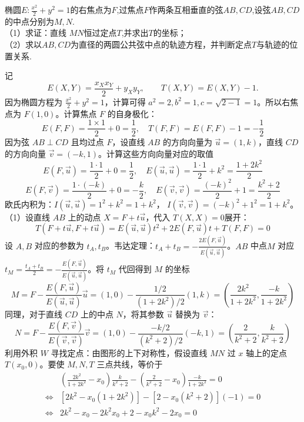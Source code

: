 \begin{exercise}
    椭圆$E:\frac{x^2}2+y^2=1$的右焦点为$F$,过焦点$F$作两条互相垂直的弦$AB,CD$,设弦$AB,CD$ 的中点分别为$M,N.$\\
（1）求证：直线 $MN$恒过定点$T$,并求出$T$的坐标；\\
（2）求以$AB,CD$为直径的两圆公共弦中点的轨迹方程，并判断定点$T$与轨迹的位置关系.
\end{exercise}
\begin{solution}
记
\[
E(X,Y) = \frac{x_X x_Y}{2} + y_X y_Y,\qquad T(X,Y) = E(X,Y) - 1.
\]
因为椭圆方程为 $\frac{x^2}{2} + y^2 = 1$，计算可得 $a^2=2, b^2=1, c = \sqrt{2-1} = 1$。所以右焦点为 $F(1, 0)$。计算焦点 $F$ 的自身极化：
$$E(F,F) = \frac{1 \times 1}{2} + 0 = \frac{1}{2}, \quad T(F,F) = E(F,F) - 1 = -\frac{1}{2}$$
因为弦 $AB \perp CD$ 且均过点 $F$，设直线 $AB$ 的方向向量为 $\vec{u} = (1, k)$，直线 $CD$ 的方向向量 $\vec{v} = (-k, 1)$。计算这些方向向量对应的取值
$$E(F,\vec{u}) = \frac{1 \cdot 1}{2} + 0 = \frac{1}{2}, \quad E(\vec{u},\vec{u}) = \frac{1 \cdot 1}{2} + k^2 = \frac{1+2k^2}{2}$$
$$E(F,\vec{v}) = \frac{1 \cdot (-k)}{2} + 0 = -\frac{k}{2}, \quad E(\vec{v},\vec{v}) = \frac{(-k)^2}{2} + 1 = \frac{k^2+2}{2}$$
欧氏内积为：$I(\vec{u},\vec{u}) = 1^2+k^2 = 1+k^2$， $I(\vec{v},\vec{v}) = (-k)^2+1^2 = 1+k^2$。\\
（1）设直线 $AB$ 上的动点 $X = F + t\vec{u}$，代入 $T(X,X)=0$展开：
$$T(F+t\vec{u}, F+t\vec{u}) = E(\vec{u},\vec{u})t^2 + 2E(F,\vec{u})t + T(F,F) = 0$$
设 $A, B$ 对应的参数为 $t_A, t_B$。韦达定理：$t_A + t_B = -\frac{2E(F,\vec{u})}{E(\vec{u},\vec{u})}$。$AB$ 中点$M$ 对应 $t_M = \frac{t_A+t_B}{2} = -\frac{E(F,\vec{u})}{E(\vec{u},\vec{u})}$。将 $t_M$ 代回得到 $M$ 的坐标
$$M = F - \frac{E(F,\vec{u})}{E(\vec{u},\vec{u})}\vec{u} = (1,0) - \frac{1/2}{(1+2k^2)/2} (1,k) = \left( \frac{2k^2}{1+2k^2}, \frac{-k}{1+2k^2} \right)$$
同理，对于直线 $CD$ 上的中点 $N$，将其参数 $\vec{u}$ 替换为 $\vec{v}$：
$$N = F - \frac{E(F,\vec{v})}{E(\vec{v},\vec{v})}\vec{v} = (1,0) - \frac{-k/2}{(k^2+2)/2} (-k,1) = \left( \frac{2}{k^2+2}, \frac{k}{k^2+2} \right)$$
利用外积 $W$ 寻找定点：由图形的上下对称性，假设直线 $MN$ 过 $x$ 轴上的定点 $T(x_0, 0)$。要使 $M, N, T$ 三点共线，等价于
\begin{align*}
&\left( \frac{2k^2}{1+2k^2} - x_0 \right) \frac{k}{k^2+2} - \left( \frac{2}{k^2+2} - x_0 \right) \frac{-k}{1+2k^2} = 0\\
\Leftrightarrow & \left[ 2k^2 - x_0(1+2k^2) \right] - \left[ 2 - x_0(k^2+2) \right](-1) = 0\\
\Leftrightarrow & 2k^2 - x_0 - 2k^2 x_0 + 2 - x_0 k^2 - 2x_0 = 0\\

\end{align*}
\end{solution}
